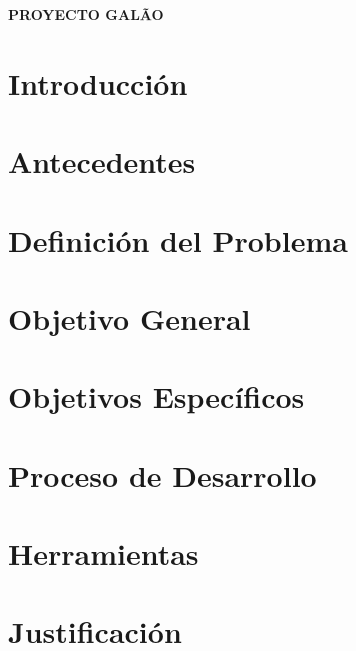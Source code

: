 \documentclass[letter,twoside,11pt]{article}
\newcommand{\blankpage}{
\newpage
\thispagestyle{empty}
\mbox{}
\newpage
}
\begin{document}
\begin{titlepage}
\begin{center}
\vspace*{2.15cm}
{\Large \textbf{PROYECTO GALÃO}}\\
\vspace*{3.5cm}
\end{center}
\end{titlepage}

\blankpage

\section{Introducción}
\section{Antecedentes}
\section{Definición del Problema}
\section{Objetivo General}
\section{Objetivos Específicos}
\section{Proceso de Desarrollo}
\section{Herramientas}
\section{Justificación}
\end{document}
